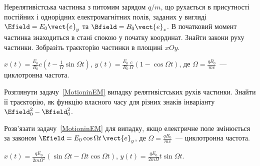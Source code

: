 \begin{problem}\label{MotioninEM}
Нерелятивістська частинка з питомим зарядом $q/m$, що рухається в присутності постійних і однорідних електромагнітних полів, заданих у вигляді $\Efield = E_0\vect{e}_y$ та $\Bfield = B_0\vect{e}_z$. В початковий момент частинка знаходиться в стані спокою у початку координат. Знайти закони руху частинки. Зобразіть траєкторію частинки в площині $xOy$.
\begin{solution}
	$x(t)  = \frac{E_0}{B_0}c\left( t - \frac{1}{\Omega}\sin\Omega t \right) $,
	$y(t)  = \frac{E_0}{B_0} \frac{c}{\Omega}\left( 1 - \cos\Omega t \right) $, де $\Omega = \frac{qB_0}{mc}$~--- циклотронна частота.
\end{solution}
\end{problem}

\begin{problem}
Розглянути задачу~\ref{MotioninEM} випадку релятивістських рухів частинки. Знайти її траєкторію, як функцію власного часу для різних знаків інваріанту $\Efield_0^2-\Bfield_0^2$. 
\end{problem}


\begin{problem}
Розв'язати задачу~\ref{MotioninEM} для випадку, якщо електричне поле змінюється за законом $\Efield = E_0\cos\Omega t\,\vect{e}_y$,  де $\Omega = \frac{qB_0}{mc}$~--- циклотронна частота.
\begin{solution}
	$x(t)  = \frac{qE_0}{2m\Omega^2}\left( \sin\Omega t - \Omega t\cos\Omega t \right) $,
	$y(t)  = \frac{qE_0}{2m\Omega}t\sin\Omega t$.
\end{solution}
\end{problem}



